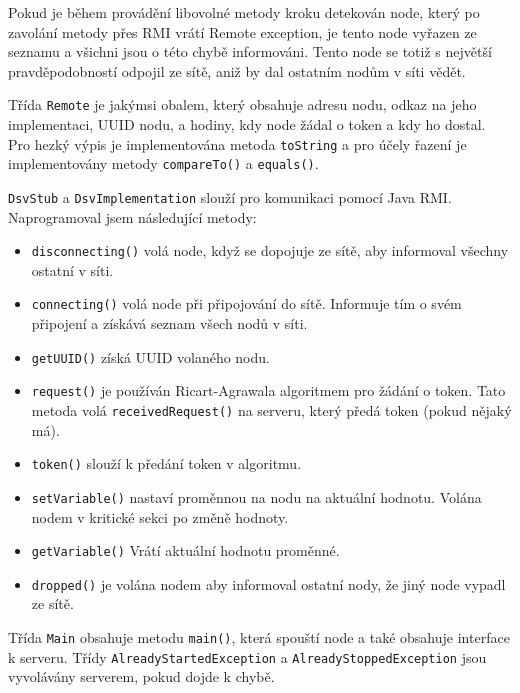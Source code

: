 \documentclass[11pt]{scrartcl}
\begin{document}
    Pokud je během provádění libovolné metody kroku detekován node, který po zavolání metody přes RMI vrátí Remote
    exception, je tento node vyřazen ze seznamu a všichni jsou o této chybě informováni. Tento node se totiž s
    největší pravděpodobností odpojil ze sítě, aniž by dal ostatním nodům v síti vědět.

    Třída \texttt{Remote} je jakýmsi obalem, který obsahuje adresu nodu, odkaz na jeho implementaci, UUID nodu, a
    hodiny, kdy node žádal o token a kdy ho dostal. Pro hezký výpis je implementována metoda \texttt{toString} a pro
    účely řazení je implementovány metody \texttt{compareTo()} a \texttt{equals()}.

    \texttt{DsvStub} a \texttt{DsvImplementation} slouží pro komunikaci pomocí Java RMI. Naprogramoval jsem
    následující metody:

    \begin{itemize}
        \item \texttt{disconnecting()} volá node, když se dopojuje ze sítě, aby informoval všechny ostatní v síti.
        \item \texttt{connecting()} volá node při připojování do sítě. Informuje tím o svém připojení a získává
        seznam všech nodů v síti.
        \item \texttt{getUUID()} získá UUID volaného nodu.
        \item \texttt{request()} je používán Ricart-Agrawala algoritmem pro žádání o token. Tato metoda volá
        \texttt{receivedRequest()} na serveru, který předá token (pokud nějaký má).
        \item \texttt{token()} slouží k předání token v algoritmu.
        \item \texttt{setVariable()} nastaví proměnnou na nodu na aktuální hodnotu. Volána nodem v kritické sekci po
        změně hodnoty.
        \item \texttt{getVariable()} Vrátí aktuální hodnotu proměnné.
        \item \texttt{dropped()} je volána nodem aby informoval ostatní nody, že jiný node vypadl ze sítě.
    \end{itemize}

    Třída \texttt{Main} obsahuje metodu \texttt{main()}, která spouští node a také obsahuje interface k serveru.
    Třídy \texttt{AlreadyStartedException} a \texttt{AlreadyStoppedException} jsou vyvolávány serverem, pokud dojde k
    chybě.
\end{document}
